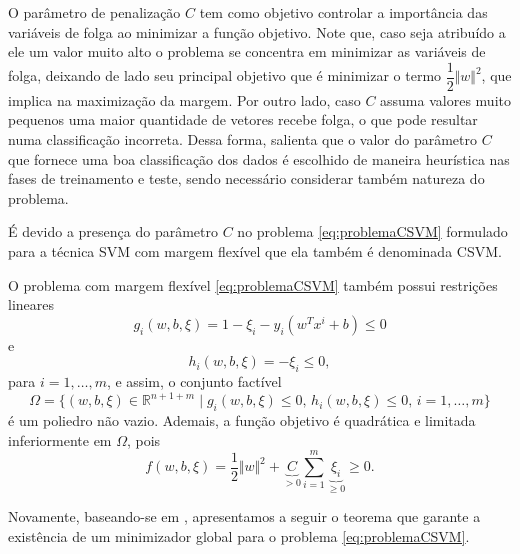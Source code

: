 \documentclass[12pt,a4paper]{scrartcl}
\def\RR{\mathds{R}}
\theoremstyle{definition}%
\begin{document}
O parâmetro de penalização $C$ tem como objetivo controlar a importância das variáveis de folga ao minimizar a função objetivo. Note que, caso seja atribuído a ele um valor muito alto o problema se concentra em minimizar as variáveis de folga, deixando de lado seu principal objetivo que é minimizar o termo $\dfrac{1}{2} \Vert w \Vert^{2}$, que implica na maximização da margem. Por outro lado, caso $C$ assuma valores muito pequenos uma maior quantidade de vetores recebe folga, o que pode resultar numa classificação incorreta. Dessa forma, \textcite{Evelin2017} salienta que o valor do parâmetro $C$ que fornece uma boa classificação dos dados é escolhido de maneira heurística nas fases de treinamento e teste, sendo necessário considerar também natureza do problema. 

É devido a presença do parâmetro $C$ no problema \eqref{eq:problemaCSVM} formulado para a técnica SVM com margem flexível que ela também é denominada CSVM.


O problema com margem flexível \eqref{eq:problemaCSVM} também possui restrições lineares 
\[ 
g_{i}(w,b,\xi) = 1-\xi_{i} - y_i(w^{T}x^{i}+b) \leq 0 
\]
e 
\[
h_{i}(w,b,\xi) = - \xi_{i} \leq 0,
\]
para $i=1, \ldots, m$, e assim, o conjunto factível
\[ \label{conjunto_factivel_problema_SVM_flexivel}
\Omega = \{(w,b,\xi) \in \RR^{n+1+m} \mid g_{i}(w,b,\xi) \leq 0, \, h_{i}(w,b,\xi) \leq 0, \, i=1, \ldots, m \} 
\]
é um poliedro não vazio. Ademais, a função objetivo é quadrática e limitada inferiormente em $\Omega$, pois 
\[ \label{funcao_objetivo_problema_SVM_flexivel_limitada}
f(w,b,\xi) = \dfrac{1}{2} \Vert w\Vert^{2} + \underbrace{C}_{> 0} \sum_{i=1}^{m} \underbrace{\xi_{i}}_{\geq 0} \geq 0.
\]

Novamente, baseando-se em \textcite{Evelin2017}, apresentamos a seguir o teorema que garante a existência de um minimizador global para o problema \eqref{eq:problemaCSVM}.
\end{document}
